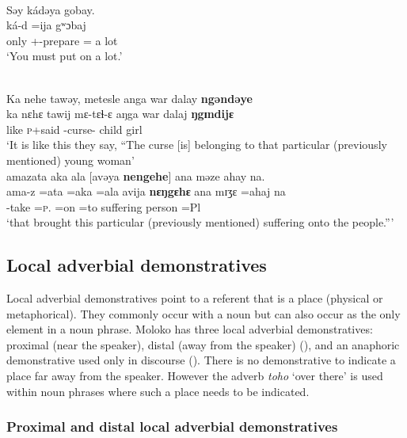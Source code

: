\medskip
 \\
 {Səy  kádəya  gobay.}\\
 ká-d    =ija  gʷɔbaj\\
only    {\twoS}+{\IFV}-prepare  ={\PLU}   {a lot}\\
\glt ‘You must put on a lot.’

\medskip
{}\\
Ka  nehe  tawəy,  metesle  anga  war  dalay \textbf{ngəndəye}\\
\gll ka  nɛhɛ  tawij  mɛ-tɛɬ-ɛ      aŋga  war    dalaj  \textbf{ŋgɪndijɛ}\\
like  {\DEM}   \textsc{p}+said  {\NOM}{}-curse-{\CL}   {\POSS}   child  girl       {\DEM}      \\
\glt ‘It is like this they say, “The curse [is] belonging to that particular (previously mentioned) young woman’\\

\medskip
     amazata  aka  ala    [avəya \textbf{nengehe}] ana  məze  ahay  na.\\
\gll ama-z        =ata                                =aka  =ala      avija  \textbf{nɛŋgɛhɛ} ana    mɪʒɛ  =ahaj   na\\
     {\DEP}-take  =\textsc{p}.{\IO}   =on     =to  suffering  {\DEM}      {\DAT} person    =Pl  {\PSP}\\
\glt ‘that brought this particular (previously mentioned)  suffering onto the people.”’  
\z

\subsection{Local adverbial demonstratives}\label{sec:3.2.2}
\hypertarget{RefHeading1210981525720847}{}
Local adverbial demonstratives point to a referent that is a place (physical or metaphorical). They commonly occur with a noun but can also occur as the only element in a noun phrase. Moloko has three local adverbial demonstratives: proximal (near the speaker), distal (away from the speaker) (), and an anaphoric demonstrative used only in discourse (). There is no demonstrative to indicate a place far away from the speaker. However the adverb \textit{toho} ‘over there’ is used within noun phrases where such a place needs to be indicated. 

\subsubsection{Proximal and distal local adverbial demonstratives}\label{sec:3.2.2.1}

